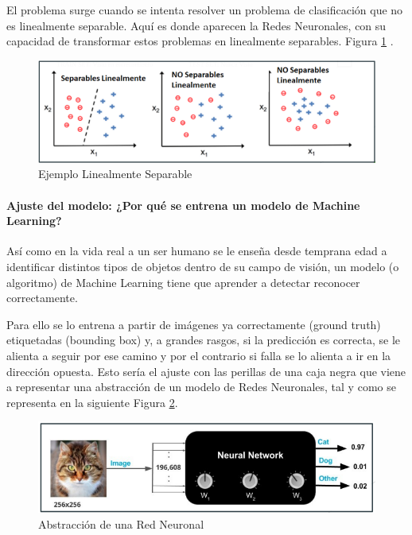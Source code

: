 \newpage
El problema surge cuando se intenta resolver un problema de clasificación que no es linealmente separable. Aquí es donde aparecen la Redes Neuronales, con su capacidad de transformar estos problemas en linealmente separables. Figura \ref{fig:linealmente separables} \cite{aprendisajesup}.

\begin{figure}[h!]
    \centering
    \includegraphics[width=1\textwidth]{img/linealmenteSeparable.png}
    \caption{Ejemplo Linealmente Separable}
    \label{fig:linealmente separables}
\end{figure}

\newpage
\paragraph{Ajuste del modelo: ¿Por qué se entrena un modelo de Machine Learning?}

Así como en la vida real a un ser humano se le enseña desde temprana edad a identificar distintos tipos de objetos dentro de su campo de visión, un modelo (o algoritmo) de Machine Learning tiene que aprender a detectar reconocer correctamente.

Para ello se lo entrena a partir de imágenes ya correctamente (ground truth) etiquetadas (bounding box) y, a grandes rasgos, si la predicción es correcta, se le alienta a seguir por ese camino y por el contrario si falla se lo alienta a ir en la dirección opuesta. Esto sería el ajuste con las perillas de una caja negra que viene a representar una abstracción de un modelo de Redes Neuronales, tal y como se representa en la siguiente Figura \ref{fig:abstraccion red neuronal}.

\begin{figure}[h]
    \centering
    \includegraphics[width=1\textwidth]{img/RedNeuronal.png}
    \caption{Abstracción de una Red Neuronal \cite{redneuronalbasic}}
    \label{fig:abstraccion red neuronal}
\end{figure}

